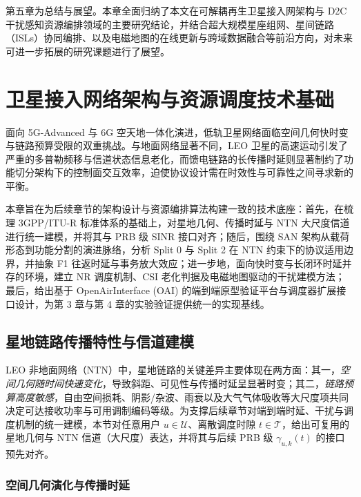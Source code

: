 \documentclass[type=master]{fduthesis}
\begin{document}
第五章为总结与展望。本章全面归纳了本文在可解耦再生卫星接入网架构与 D2C 干扰感知资源编排领域的主要研究结论，并结合超大规模星座组网、星间链路（ISLs）协同编排、以及电磁地图的在线更新与跨域数据融合等前沿方向，对未来可进一步拓展的研究课题进行了展望。

\chapter{卫星接入网络架构与资源调度技术基础}
\label{chap:ch2}

面向 5G-Advanced 与 6G 空天地一体化演进，低轨卫星网络面临空间几何快时变与链路预算受限的双重挑战。与地面网络显著不同，LEO 卫星的高速运动引发了严重的多普勒频移与信道状态信息老化，而馈电链路的长传播时延则显著制约了功能切分架构下的控制面交互效率，迫使协议设计需在时效性与可靠性之间寻求新的平衡。

本章旨在为后续章节的架构设计与资源编排算法构建一致的技术底座：首先，在梳理 3GPP/ITU-R 标准体系的基础上，对星地几何、传播时延与 NTN 大尺度信道进行统一建模，并将其与 PRB 级 SINR 接口对齐；随后，围绕 SAN 架构从载荷形态到功能分割的演进脉络，分析 Split 0 与 Split 2 在 NTN 约束下的协议适用边界，并抽象 F1 往返时延与事务放大效应；进一步地，面向快时变与长闭环时延并存的环境，建立 NR 调度机制、CSI 老化判据及电磁地图驱动的干扰建模方法；最后，给出基于 OpenAirInterface (OAI) 的端到端原型验证平台与调度器扩展接口设计，为第 3 章与第 4 章的实验验证提供统一的实现基线。

\section{星地链路传播特性与信道建模}
\label{sec:ch2_geo_channel}

LEO 非地面网络（NTN）中，星地链路的关键差异主要体现在两方面：其一，\emph{空间几何随时间快速变化}，导致斜距、可见性与传播时延呈显著时变；其二，\emph{链路预算高度敏感}，自由空间损耗、阴影/杂波、雨衰以及大气气体吸收等大尺度项共同决定可达接收功率与可用调制编码等级。为支撑后续章节对端到端时延、干扰与调度机制的统一建模，本节对任意用户 $u\in\mathcal{U}$、离散调度时隙 $t\in\mathcal{T}$，给出可复用的星地几何与 NTN 信道（大尺度）表达，并将其与后续 PRB 级 $\gamma_{u,k}(t)$ 的接口预先对齐。

\subsection{空间几何演化与传播时延}
\label{subsec:ch2_geo_geometry_delay}
\end{document}
